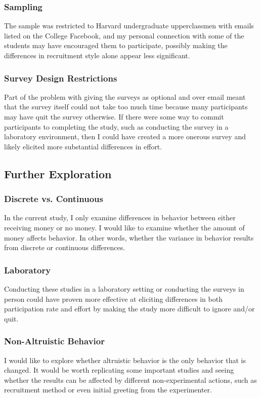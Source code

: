 \documentclass[12pt]{article}
\begin{document}
\subsubsection{Sampling}
The sample was restricted to Harvard undergraduate upperclassmen with emails listed on the College Facebook, and my personal connection with some of the students may have encouraged them to participate, possibly making the differences in recruitment style alone appear less significant. 

\subsubsection{Survey Design Restrictions}
Part of the problem with giving the surveys as optional and over email meant that the survey itself could not take too much time because many participants may have quit the survey otherwise. If there were some way to commit participants to completing the study, such as conducting the survey in a laboratory environment, then I could have created a more onerous survey and likely elicited more substantial differences in effort. 

\subsection{Further Exploration}

\subsubsection{Discrete vs. Continuous}
In the current study, I only examine differences in behavior between either receiving money or no money. I would like to examine whether the amount of money affects behavior. In other words, whether the variance in behavior results from discrete or continuous differences. 


\subsubsection{Laboratory}
Conducting these studies in a laboratory setting or conducting the surveys in person could have proven more effective at eliciting differences in both participation rate and effort by making the study more difficult to ignore and/or quit.

\subsubsection{Non-Altruistic Behavior}
I would like to explore whether altruistic behavior is the only behavior that is changed. It would be worth replicating some important studies and seeing whether the results can be affected by different non-experimental actions, such as recruitment method or even initial greeting from the experimenter. 

\medskip

\end{document}

